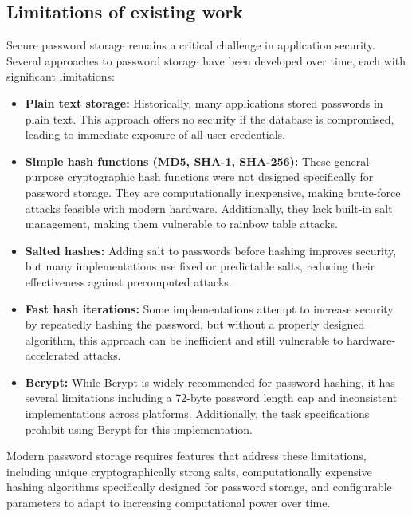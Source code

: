\documentclass[11pt,a4paper]{article}
\begin{document}
            \subsection{Limitations of existing work} 
            Secure password storage remains a critical challenge in application security. Several approaches to password storage have been developed over time, each with significant limitations:
            \begin{itemize}
              \item \textbf{Plain text storage:} Historically, many applications stored passwords in plain text. This approach offers no security if the database is compromised, leading to immediate exposure of all user credentials.
              
              \item \textbf{Simple hash functions (MD5, SHA-1, SHA-256):} These general-purpose cryptographic hash functions were not designed specifically for password storage. They are computationally inexpensive, making brute-force attacks feasible with modern hardware. Additionally, they lack built-in salt management, making them vulnerable to rainbow table attacks.
              
              \item \textbf{Salted hashes:} Adding salt to passwords before hashing improves security, but many implementations use fixed or predictable salts, reducing their effectiveness against precomputed attacks.
              
              \item \textbf{Fast hash iterations:} Some implementations attempt to increase security by repeatedly hashing the password, but without a properly designed algorithm, this approach can be inefficient and still vulnerable to hardware-accelerated attacks.
              
              \item \textbf{Bcrypt:} While Bcrypt is widely recommended for password hashing, it has several limitations including a 72-byte password length cap and inconsistent implementations across platforms. Additionally, the task specifications prohibit using Bcrypt for this implementation.
            \end{itemize}
            
            Modern password storage requires features that address these limitations, including unique cryptographically strong salts, computationally expensive hashing algorithms specifically designed for password storage, and configurable parameters to adapt to increasing computational power over time.            
\end{document}
